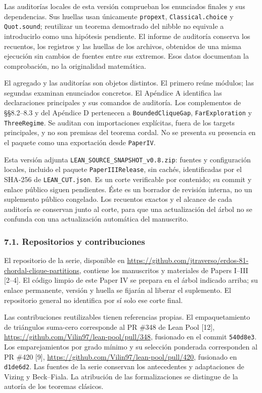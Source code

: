 \documentclass[spanish,11pt,a4paper]{article}
\begin{document}
Las auditorías locales de esta versión comprueban los enunciados finales y sus dependencias. Sus huellas usan únicamente \nolinkurl{propext}, \nolinkurl{Classical.choice} y \nolinkurl{Quot.sound}; reutilizar un teorema demostrado del nibble no equivale a introducirlo como una hipótesis pendiente. El informe de auditoría conserva los recuentos, los registros y las huellas de los archivos, obtenidos de una misma ejecución sin cambios de fuentes entre sus extremos. Esos datos documentan la comprobación, no la originalidad matemática.

El agregado y las auditorías son objetos distintos. El primero reúne módulos; las segundas examinan enunciados concretos. El Apéndice A identifica las declaraciones principales y sus comandos de auditoría. Los complementos de §§8.2--8.3 y del Apéndice D pertenecen a \nolinkurl{BoundedCliqueGap}, \nolinkurl{FarExploration} y \nolinkurl{ThreeRegime}. Se auditan con importaciones explícitas, fuera de los targets principales, y no son premisas del teorema cordal. No se presenta su presencia en el paquete como una exportación desde \nolinkurl{PaperIV}.

Esta versión adjunta \nolinkurl{LEAN_SOURCE_SNAPSHOT_v0.8.zip}: fuentes y configuración locales, incluido el paquete \nolinkurl{PaperIIIRelease}, sin cachés, identificadas por el SHA-256 de \nolinkurl{LEAN_CUT.json}. Es un corte verificable por contenido; su commit y enlace público siguen pendientes. Éste es un borrador de revisión interna, no un suplemento público congelado. Los recuentos exactos y el alcance de cada auditoría se conservan junto al corte, para que una actualización del árbol no se confunda con una actualización automática del manuscrito.

\subsubsection{7.1. Repositorios y contribuciones}\label{repositorios-y-contribuciones}

El repositorio de la serie, disponible en \url{https://github.com/jtraverso/erdos-81-chordal-clique-partitions}, contiene los manuscritos y materiales de Papers I--III {[}2--4{]}. El código limpio de este Paper IV se prepara en el árbol indicado arriba; su enlace permanente, versión y huella se fijarán al liberar el suplemento. El repositorio general no identifica por sí solo ese corte final.

Las contribuciones reutilizables tienen referencias propias. El empaquetamiento de triángulos suma-cero corresponde al PR \#348 de Lean Pool {[}12{]}, \url{https://github.com/Vilin97/lean-pool/pull/348}, fusionado en el commit \nolinkurl{540d8e3}. Los emparejamientos por grado mínimo y su selección ponderada corresponden al PR \#420 {[}9{]}, \url{https://github.com/Vilin97/lean-pool/pull/420}, fusionado en \nolinkurl{d1de6d2}. Las fuentes de la serie conservan los antecedentes y adaptaciones de Vizing y Beck--Fiala. La atribución de las formalizaciones se distingue de la autoría de los teoremas clásicos.
\end{document}
